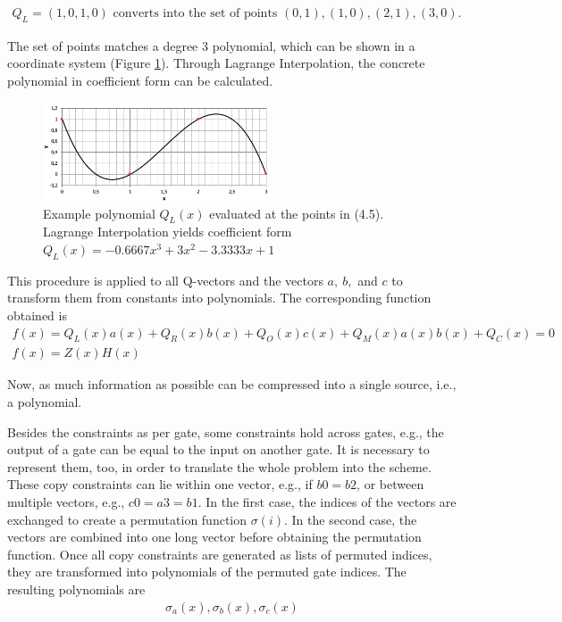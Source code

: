\begin{align}
    Q_L = (1,0,1,0) \text{ converts into the set of points } {(0,1), (1,0), (2,1), (3,0)}.
\end{align}

The set of points matches a degree 3 polynomial, which can be shown in a coordinate system (Figure \ref{fig:examplepoly}). Through Lagrange Interpolation, the concrete polynomial in coefficient form can be calculated. 
\begin{figure}[hbt]
	\centering
	\includegraphics[width=0.6\textwidth]{Pictures/example_polynomial.png}
	\caption{Example polynomial \(Q_{L}(x)\) evaluated at the points in (4.5). Lagrange Interpolation yields coefficient form \(Q_{L}(x) = - 0.6667x^3 + 3x^2 - 3.3333x + 1\)}
	\label{fig:examplepoly}
\end{figure}

This procedure is applied to all Q-vectors and the vectors \(a,\ b,\) and \(c\) to transform them from constants into polynomials. The corresponding function obtained is
\begin{align}
    f(x) = Q_{L}(x)a(x) + Q_{R}(x)b(x) + Q_{O}(x)c(x) + Q_{M}(x)a(x)b(x) + Q_{C}(x) = 0\\
    f(x) = Z(x)H(x)
\end{align}

Now, as much information as possible can be compressed into a single source, i.e., a polynomial. 

Besides the constraints as per gate, some constraints hold across gates, e.g., the output of a gate can be equal to the input on another gate. It is necessary to represent them, too, in order to translate the whole problem into the scheme. These copy constraints can lie within one vector, e.g., if \(b0 = b2\), or between multiple vectors, e.g., \(c0 = a3 = b1\). In the first case, the indices of the vectors are exchanged to create a permutation function \(\sigma(i)\). In the second case, the vectors are combined into one long vector before obtaining the permutation function. Once all copy constraints are generated as lists of permuted indices, they are transformed into polynomials of the permuted gate indices. The resulting polynomials are
\begin{align}
    \sigma_{a}(x), \sigma_{b}(x), \sigma_{c}(x)
\end{align}

